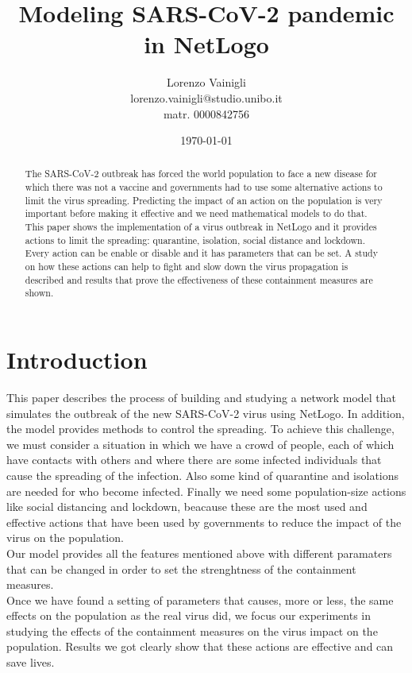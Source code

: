 \documentclass[12pt]{llncs}
\title{Modeling SARS-CoV-2 pandemic in NetLogo}
\author{Lorenzo Vainigli \\
lorenzo.vainigli@studio.unibo.it \\
matr. 0000842756}
\institute{Course of Complex Systems and Network Science \\
Laurea Magistrale in Informatica \\
University of Bologna \\
A.Y. 2020-2021}
\date{\today}
\begin{document}
{\def\addcontentsline#1#2#3{}\maketitle}

\begin{abstract}
The SARS-CoV-2 outbreak has forced the world population to face a new disease for which there was not a vaccine and governments had to use some alternative actions to limit the virus spreading. Predicting the impact of an action on the population is very important before making it effective and we need mathematical models to do that. This paper shows the implementation of a virus outbreak in NetLogo and it provides actions to limit the spreading: quarantine, isolation, social distance and lockdown. Every action can be enable or disable and it has parameters that can be set. A study on how these actions can help to fight and slow down the virus propagation is described and results that prove the effectiveness of these containment measures are shown.
\end{abstract}

\begingroup
\let\clearpage\relax
\renewcommand{\contentsname}{}
\setcounter{tocdepth}{2}
\tableofcontents
\endgroup

\section{Introduction}
This paper describes the process of building and studying a network model that simulates the outbreak of the new SARS-CoV-2 virus using NetLogo. In addition, the model provides methods to control the spreading. To achieve this challenge, we must consider a situation in which we have a crowd of people, each of which have contacts with others and where there are some infected individuals that cause the spreading of the infection. Also some kind of quarantine and isolations are needed for who become infected. Finally we need some population-size actions like social distancing and lockdown, beacause these are the most used and effective actions that have been used by governments to reduce the impact of the virus on the population.\\
Our model provides all the features mentioned above with different paramaters that can be changed in order to set the strenghtness of the containment measures.\\
Once we have found a setting of parameters that causes, more or less, the same effects on the population as the real virus did, we focus our experiments in studying the effects of the containment measures on the virus impact on the population. Results we got clearly show that these actions are effective and can save lives.
\end{document}
